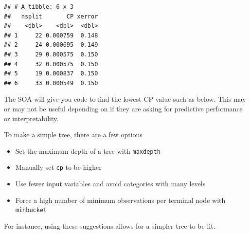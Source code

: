 \documentclass[openany]{book}
\newenvironment{Shaded}{\begin{snugshade}}{\end{snugshade}}
\newcommand{\DataTypeTok}[1]{\textcolor[rgb]{0.13,0.29,0.53}{#1}}
\newcommand{\KeywordTok}[1]{\textcolor[rgb]{0.13,0.29,0.53}{\textbf{#1}}}
\newcommand{\NormalTok}[1]{#1}
\newcommand{\OperatorTok}[1]{\textcolor[rgb]{0.81,0.36,0.00}{\textbf{#1}}}
\newcommand{\StringTok}[1]{\textcolor[rgb]{0.31,0.60,0.02}{#1}}
\providecommand{\tightlist}{%
  \setlength{\itemsep}{0pt}\setlength{\parskip}{0pt}}
\begin{document}
\begin{verbatim}
## # A tibble: 6 x 3
##   nsplit       CP xerror
##    <dbl>    <dbl>  <dbl>
## 1     22 0.000759  0.148
## 2     24 0.000695  0.149
## 3     29 0.000575  0.150
## 4     32 0.000575  0.150
## 5     19 0.000837  0.150
## 6     33 0.000549  0.150
\end{verbatim}

The SOA will give you code to find the lowest CP value such as below. This may or may not be useful depending on if they are asking for predictive performance or interpretability.

\begin{Shaded}
\end{Shaded}

To make a simple tree, there are a few options

\begin{itemize}
\tightlist
\item
  Set the maximum depth of a tree with \texttt{maxdepth}
\item
  Manually set \texttt{cp} to be higher
\item
  Use fewer input variables and avoid categories with many levels
\item
  Force a high number of minimum observations per terminal node with \texttt{minbucket}
\end{itemize}

For instance, using these suggestions allows for a simpler tree to be fit.
\end{document}
